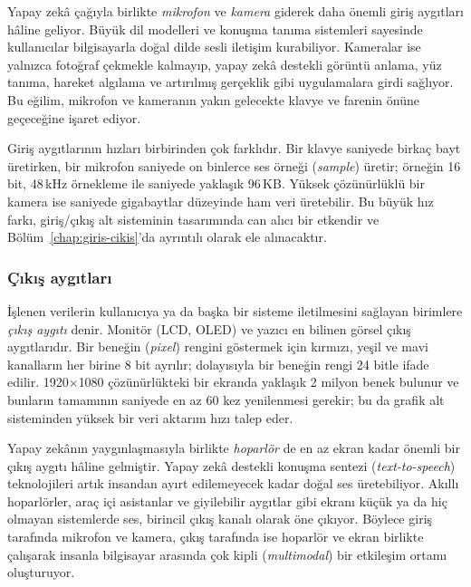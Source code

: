 Yapay zekâ çağıyla birlikte \emph{mikrofon} ve \emph{kamera} giderek daha önemli giriş aygıtları hâline geliyor. Büyük dil modelleri ve konuşma tanıma sistemleri sayesinde kullanıcılar bilgisayarla doğal dilde sesli iletişim kurabiliyor. Kameralar ise yalnızca fotoğraf çekmekle kalmayıp, yapay zekâ destekli görüntü anlama, yüz tanıma, hareket algılama ve artırılmış gerçeklik gibi uygulamalara girdi sağlıyor. Bu eğilim, mikrofon ve kameranın yakın gelecekte klavye ve farenin önüne geçeceğine işaret ediyor.

Giriş aygıtlarının hızları birbirinden çok farklıdır. Bir klavye saniyede birkaç bayt üretirken, bir mikrofon saniyede on binlerce ses örneği (\emph{sample}) üretir; örneğin 16 bit, 48\,kHz örnekleme ile saniyede yaklaşık 96\,KB. Yüksek çözünürlüklü bir kamera ise saniyede gigabaytlar düzeyinde ham veri üretebilir. Bu büyük hız farkı, giriş/çıkış alt sisteminin tasarımında can alıcı bir etkendir ve Bölüm~\ref{chap:giris-cikis}'da ayrıntılı olarak ele alınacaktır.

\subsubsection*{Çıkış aygıtları}
İşlenen verilerin kullanıcıya ya da başka bir sisteme iletilmesini sağlayan birimlere \emph{çıkış aygıtı} denir. Monitör (LCD, OLED) ve yazıcı en bilinen görsel çıkış aygıtlarıdır. Bir beneğin (\emph{pixel}) rengini göstermek için kırmızı, yeşil ve mavi kanalların her birine 8 bit ayrılır; dolayısıyla bir beneğin rengi 24 bitle ifade edilir. 1920$\times$1080 çözünürlükteki bir ekranda yaklaşık 2 milyon benek bulunur ve bunların tamamının saniyede en az 60 kez yenilenmesi gerekir; bu da grafik alt sisteminden yüksek bir veri aktarım hızı talep eder.

Yapay zekânın yaygınlaşmasıyla birlikte \emph{hoparlör} de en az ekran kadar önemli bir çıkış aygıtı hâline gelmiştir. Yapay zekâ destekli konuşma sentezi (\emph{text-to-speech}) teknolojileri artık insandan ayırt edilemeyecek kadar doğal ses üretebiliyor. Akıllı hoparlörler, araç içi asistanlar ve giyilebilir aygıtlar gibi ekranı küçük ya da hiç olmayan sistemlerde ses, birincil çıkış kanalı olarak öne çıkıyor. Böylece giriş tarafında mikrofon ve kamera, çıkış tarafında ise hoparlör ve ekran birlikte çalışarak insanla bilgisayar arasında çok kipli (\emph{multimodal}) bir etkileşim ortamı oluşturuyor.

